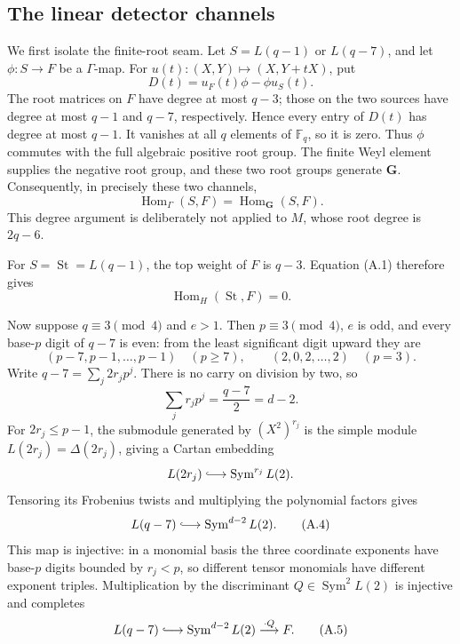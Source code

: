 \documentclass[11pt]{article}
\theoremstyle{definition}
\theoremstyle{remark}
\newcommand{\F}{\mathbb{F}}
\begin{document}
\subsection{The linear detector channels}
\label{app:linear-detectors}

We first isolate the finite-root seam.  Let \(S=L(q-1)\) or \(L(q-7)\),
and let \(\phi:S\to F\) be a \(\Gamma\)-map.  For
\(u(t):(X,Y)\mapsto(X,Y+tX)\), put
\[
 D(t)=u_F(t)\phi-\phi u_S(t).
\]
The root matrices on \(F\) have degree at most \(q-3\); those on the two
sources have degree at most \(q-1\) and \(q-7\), respectively.  Hence
every entry of \(D(t)\) has degree at most \(q-1\).  It vanishes at all
\(q\) elements of \(\F_q\), so it is zero.  Thus \(\phi\) commutes with
the full algebraic positive root group.  The finite Weyl element supplies
the negative root group, and these two root groups generate \(\mathbf G\).
Consequently, in precisely these two channels,
\[
 \operatorname{Hom}_{\Gamma}(S,F)
 =\operatorname{Hom}_{\mathbf G}(S,F).                 \tag{A.1}
\]
This degree argument is deliberately not applied to \(M\), whose root
degree is \(2q-6\).

For \(S=\operatorname{St}=L(q-1)\), the top weight of \(F\) is \(q-3\).
Equation (A.1) therefore gives
\[
 \operatorname{Hom}_H(\operatorname{St},F)=0.          \tag{A.2}
\]

Now suppose \(q\equiv3\pmod4\) and \(e>1\).  Then
\(p\equiv3\pmod4\), \(e\) is odd, and every base-\(p\) digit of
\(q-7\) is even: from the least significant digit upward they are
\[
 (p-7,p-1,\ldots,p-1)\quad(p\ge7),\qquad
 (2,0,2,\ldots,2)\quad(p=3).
\]
Write \(q-7=\sum_j2r_jp^j\).  There is no carry on division by two, so
\[
 \sum_jr_jp^j=\frac{q-7}{2}=d-2.                       \tag{A.3}
\]
For \(2r_j\le p-1\), the submodule generated by
\((X^2)^{r_j}\) is the simple module
\(L(2r_j)=\Delta(2r_j)\), giving a Cartan embedding
\[
 L(2r_j)\lhook\joinrel\longrightarrow
 \operatorname{Sym}^{r_j}L(2).
\]
Tensoring its Frobenius twists and multiplying the polynomial factors
gives
\[
 L(q-7)\lhook\joinrel\longrightarrow
 \operatorname{Sym}^{d-2}L(2).                         \tag{A.4}
\]
This map is injective: in a monomial basis the three coordinate exponents
have base-\(p\) digits bounded by \(r_j<p\), so different tensor monomials
have different exponent triples.  Multiplication by the discriminant
\(Q\in\operatorname{Sym}^2L(2)\) is injective and completes
\[
 L(q-7)\lhook\joinrel\longrightarrow
 \operatorname{Sym}^{d-2}L(2)
 \mathrel{\mathop{\longrightarrow}^{\cdot Q}}F.        \tag{A.5}
\]
\end{document}
